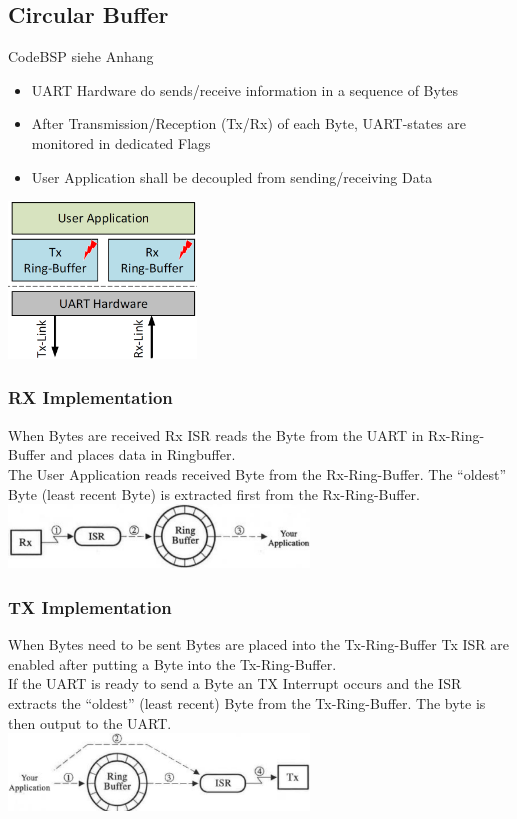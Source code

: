 \begin{minipage}{12cm}
    \subsection{Circular Buffer}
    CodeBSP siehe Anhang \label{CircularBuffer}
	\begin{itemize}
		\item \acs{UART} Hardware do sends/receive information in a sequence of Bytes
		\item After Transmission/Reception (Tx/Rx) of each Byte, \acs{UART}-states are monitored in dedicated Flags
		\item User Application shall be decoupled from sending/receiving Data
	\end{itemize}
\end{minipage}
\begin{minipage}{5cm}
	\includegraphics[width=5cm]{images/ringbuffer}
\end{minipage}
\begin{multicols}{2}
\subsubsection{RX Implementation}
When Bytes are received Rx \acs{ISR} reads the Byte from the \acs{UART} in Rx-Ring-Buffer and places data in Ringbuffer. \\
The User Application reads received Byte from the Rx-Ring-Buffer. The "`oldest"' Byte (least recent Byte) is extracted first from the Rx-Ring-Buffer.\\
\includegraphics[width=8cm]{images/rx_buffer}
\subsubsection{TX Implementation}
When Bytes need to be sent Bytes are placed into the Tx-Ring-Buffer Tx \acs{ISR} are enabled after putting a Byte into the Tx-Ring-Buffer. \\
If the \acs{UART} is ready to send a Byte an TX Interrupt occurs and the ISR extracts the "`oldest"' (least recent) Byte from the Tx-Ring-Buffer. The byte is then output to the \acs{UART}.\\
\includegraphics[width=8cm]{images/tx_buffer}
\end{multicols}
\clearpage

